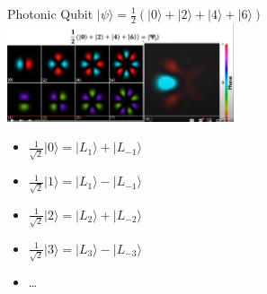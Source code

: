 \documentclass[aspectratio=169,9pt]{beamer}
\begin{document}
\begin{frame}[t]{Photonic Qubit}
  $|\psi\rangle = \frac{1}{{2}}(|0\rangle+|2\rangle+|4\rangle+|6\rangle)$\\
  \includegraphics[width=0.5\textwidth]{4photon_qubit_superposition.png}
  \begin{itemize}
    \item $\frac{1}{\sqrt{2}}|0\rangle= |L_1\rangle + |L_{-1}\rangle$
    \item $\frac{1}{\sqrt{2}}|1\rangle= |L_1\rangle - |L_{-1}\rangle$
    \item $\frac{1}{\sqrt{2}}|2\rangle= |L_2\rangle + |L_{-2}\rangle$
    \item $\frac{1}{\sqrt{2}}|3\rangle= |L_3\rangle - |L_{-3}\rangle$
    \item \ldots
  \end{itemize}
\end{frame}
\end{document}
